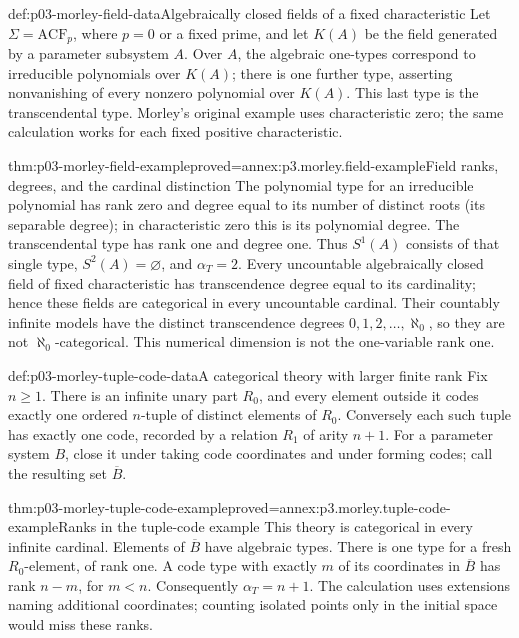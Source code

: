 \begin{hbexample}{def:p03-morley-field-data}{Algebraically closed fields of a fixed characteristic}
Let \(\Sigma=\mathrm{ACF}_p\), where \(p=0\) or a fixed prime, and
let \(K(A)\) be the field generated by a parameter subsystem \(A\).
Over \(A\), the algebraic one-types correspond to irreducible
polynomials over \(K(A)\); there is one further type, asserting
nonvanishing of every nonzero polynomial over \(K(A)\).
This last type is the transcendental type. Morley's original example
uses characteristic zero; the same calculation works for each fixed
positive characteristic.
\end{hbexample}

\begin{hbtheorem}{thm:p03-morley-field-example}{proved=annex:p3.morley.field-example}{Field ranks, degrees, and the cardinal distinction}
The polynomial type for an irreducible polynomial has rank zero
and degree equal to its number of distinct roots (its separable
degree); in characteristic zero this is its polynomial degree.
The transcendental type has rank
one and degree one. Thus \(S^1(A)\) consists of that single type,
\(S^2(A)=\varnothing\), and \(\alpha_T=2\).
Every uncountable algebraically closed field of fixed characteristic
has transcendence degree equal to its cardinality; hence these
fields are categorical in every uncountable cardinal. Their
countably infinite models have the distinct transcendence degrees
\(0,1,2,\ldots,\aleph_0\), so they are not
\(\aleph_0\)-categorical. This numerical dimension is not the
one-variable rank one.
\end{hbtheorem}

\begin{hbexample}{def:p03-morley-tuple-code-data}{A categorical theory with larger finite rank}
Fix \(n\geq1\). There is an infinite unary part \(R_0\), and every
element outside it codes exactly one ordered \(n\)-tuple of distinct
elements of \(R_0\). Conversely each such tuple has exactly one
code, recorded by a relation \(R_1\) of arity \(n+1\).
For a parameter system \(B\), close it under taking code coordinates
and under forming codes; call the resulting set \(\overline B\).
\end{hbexample}

\begin{hbtheorem}{thm:p03-morley-tuple-code-example}{proved=annex:p3.morley.tuple-code-example}{Ranks in the tuple-code example}
This theory is categorical in every infinite cardinal. Elements of
\(\overline B\) have algebraic types. There is one type for a fresh
\(R_0\)-element, of rank one. A code type with exactly \(m\) of
its coordinates in \(\overline B\) has rank \(n-m\), for
\(m<n\). Consequently \(\alpha_T=n+1\). The calculation uses
extensions naming additional coordinates; counting isolated points
only in the initial space would miss these ranks.
\end{hbtheorem}

